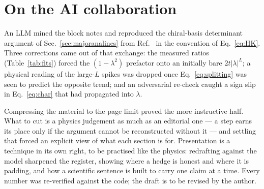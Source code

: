 
\section{On the AI collaboration}
\label{sec:ai}

An LLM mined the block notes and reproduced the chiral-basis determinant
argument of Sec.~\ref{sec:majoranalines} from Ref.~\cite{leumer2021thesis} in
the convention of Eq.~\eqref{eq:HK}. Three corrections came out of that
exchange: the measured ratios (Table~\ref{tab:fits}) forced the
$(1-\lambda^2)$ prefactor onto an initially bare $2t|\lambda|^L$; a physical
reading of the large-$L$ spikes was dropped once Eq.~\eqref{eq:splitting} was
seen to predict the opposite trend; and an adversarial re-check caught a sign
slip in Eq.~\eqref{eq:char} that had propagated into $\lambda$.

Compressing the material to the page limit proved the more instructive half. What
to cut is a physics judgement as much as an editorial one --- a step earns its
place only if the argument cannot be reconstructed without it --- and settling
that forced an explicit view of what each section is for. Presentation is a
technique in its own right, to be practised like the physics: redrafting
against the model sharpened the register, showing where a hedge is honest and
where it is padding, and how a scientific sentence is built to carry one claim
at a time. Every number was re-verified against the code; the draft is to be
revised by the author.
